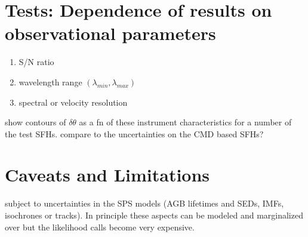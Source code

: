 \documentclass{emulateapj}
\begin{document}
\section{Tests: Dependence of results on observational parameters}

\begin{enumerate}
\item S/N ratio
\item wavelength range $(\lambda_{min}, \lambda_{max})$
\item spectral or velocity resolution
\end{enumerate}

show contours of $\delta \theta$ as a fn of these instrument characteristics for a number of the test SFHs.  compare to the uncertainties on the CMD based SFHs?

\section{Caveats and Limitations}
subject to uncertainties in the SPS models (AGB lifetimes and SEDs, IMFs, isochrones or tracks).  In principle these aspects can be modeled and marginalized over \citep{conroy09} but the likelihood calls become very expensive.
\end{document}
